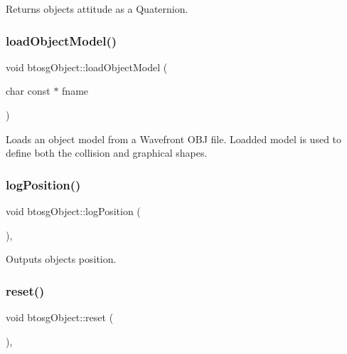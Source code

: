 Returns object\textquotesingle{}s attitude as a Quaternion. \mbox{\label{classbtosgObject_a91838b8235579da178fcc06e6d3d47f3}} 
\subsubsection{\texorpdfstring{load\+Object\+Model()}{loadObjectModel()}}
{\footnotesize\ttfamily void btosg\+Object\+::load\+Object\+Model (\begin{DoxyParamCaption}\item[{char const $\ast$}]{fname }\end{DoxyParamCaption})\hspace{0.3cm}{\ttfamily [inherited]}}

Loads an object model from a Wavefront O\+BJ file. Loadded model is used to define both the collision and graphical shapes. \mbox{\label{classbtosgObject_acfd70fa6477c80fd7f29ad7ab9f4f067}} 
\subsubsection{\texorpdfstring{log\+Position()}{logPosition()}}
{\footnotesize\ttfamily void btosg\+Object\+::log\+Position (\begin{DoxyParamCaption}{ }\end{DoxyParamCaption})\hspace{0.3cm}{\ttfamily [inline]}, {\ttfamily [inherited]}}

Outputs object\textquotesingle{}s position. \mbox{\label{classbtosgObject_a93983f9180dd0672f8779cf2baa78580}} 
\subsubsection{\texorpdfstring{reset()}{reset()}}
{\footnotesize\ttfamily void btosg\+Object\+::reset (\begin{DoxyParamCaption}{ }\end{DoxyParamCaption})\hspace{0.3cm}{\ttfamily [inline]}, {\ttfamily [inherited]}}

